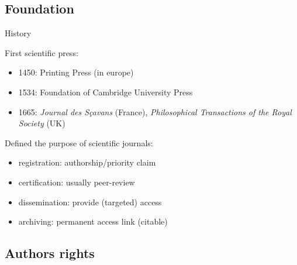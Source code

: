 \documentclass[10pt,compress,serif,aspectratio=169]{beamer}
\begin{document}
\subsection{Foundation}
\begin{frame}[t]{History}

{\large First scientific press:\newline}
 
 \begin{itemize}


 \item 1450: Printing Press (in europe)
 \item 1534: Foundation of Cambridge University Press
 \item 1665: \textit{Journal des Sçavans} (France), \textit{Philosophical Transactions of the Royal Society} (UK)\\
 \end{itemize}

 \vfill
 \pause
{\large Defined the purpose of scientific journals:\newline}

\begin{itemize}
\item registration: authorship/priority claim
\item certification: usually peer-review
\item dissemination: provide (targeted) access
\item archiving: permanent access link (citable) 
\end{itemize}
\end{frame}

\subsection{Authors rights}
\end{document}
